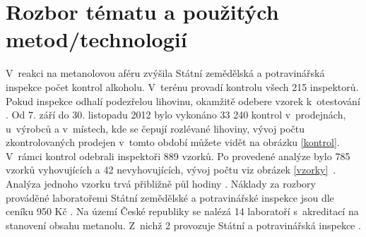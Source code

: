 \documentclass[11pt,a4paper]{article}
\begin{document}
\section{Rozbor tématu a použitých metod/technologií}
V~reakci na metanolovou aféru zvýšila Státní zemědělská a potravinářská inspekce
počet kontrol alkoholu. V~terénu provadí kontrolu všech 215 inspektorů. Pokud
inspekce odhalí podezřelou lihovinu, okamžitě odebere vzorek k~otestování \cite{szpi}. Od 7. září
do 30. listopadu 2012 bylo vykonáno 33 240 kontrol v~prodejnách, u~výrobců a v~místech, kde 
se čepují rozlévané lihoviny, vývoj počtu zkontrolovaných prodejen v~tomto období
můžete vidět na obrázku \ref{kontrol}. V~rámci kontrol odebrali inspektoři 889 vzorků. Po provedené analýze
bylo 785 vzorků vyhovujících a 42 nevyhovujících, vývoj počtu viz obrázek \ref{vzorky}~\cite{eagri}. Analýza jednoho vzorku 
trvá přibližně půl hodiny \cite{an1,an2,an3}. Náklady za rozbory prováděné laboratořemi 
Státní zemědělské a potravinářské inspekce jsou dle ceníku 950 Kč \cite{nak1}. 
Na území České republiky se nalézá 14 laboratoří s~akreditací na stanovení obsahu metanolu. 
Z~nichž 2 provozuje Státní a potravinářská inspekce \cite{akre}.
\end{document}
